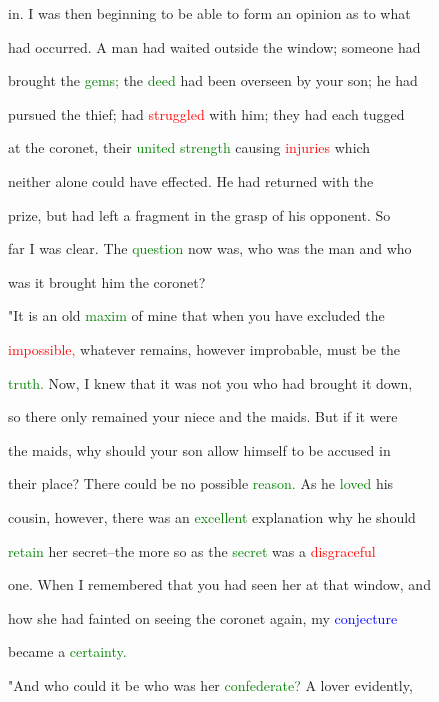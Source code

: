 in. I was then beginning to be able to form an opinion as to what

 had occurred. A man had \textcolor{BurntOrange}{waited} outside the window; someone had

 brought the \textcolor{green}{gems;} the \textcolor{green}{deed} had been overseen by your son; he had

 pursued the \textcolor{BurntOrange}{thief;} had \textcolor{red}{struggled} with him; they had each tugged

 at the coronet, their \textcolor{green}{united} \textcolor{green}{strength} causing \textcolor{red}{injuries} which

 neither alone could have effected. He had returned with the

 prize, but had left a fragment in the grasp of his \textcolor{BurntOrange}{opponent.} So

 far I was clear. The \textcolor{green}{question} now was, who was the man and who

 was it brought him the coronet?



 "It is an old \textcolor{green}{maxim} of mine that when you have excluded the

 \textcolor{red}{impossible,} whatever \textcolor{BurntOrange}{remains,} however improbable, must be the

 \textcolor{green}{truth.} Now, I knew that it was not you who had brought it down,

 so there only remained your niece and the maids. But if it were

 the maids, why should your son allow himself to be accused in

 their place? There could be no possible \textcolor{green}{reason.} As he \textcolor{green}{loved} his

 cousin, however, there was an \textcolor{green}{excellent} explanation why he should

 \textcolor{green}{retain} her secret--the more so as the \textcolor{green}{secret} was a \textcolor{red}{disgraceful}

 one. When I remembered that you had seen her at that window, and

 how she had fainted on seeing the coronet again, my \textcolor{blue}{conjecture}

 became a \textcolor{green}{certainty.}



 "And who could it be who was her \textcolor{green}{confederate?} A \textcolor{BurntOrange}{lover} evidently,

